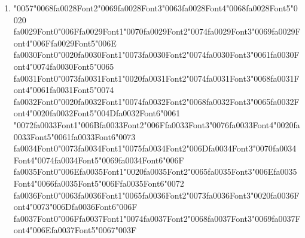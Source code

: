 \documentclass[12pt]{article}
\begin{document}
\begin{enumerate}[label=Q\arabic*.]
 \begin{enumerate}[label=(\Alph*)]
     \item The hidden state has fixed dimensionality
     \item They reuse identical parameters at every time step
     \item Gradients decay or explode during backpropagation
     \item They produce outputs only at the final step
 \end{enumerate}
 
 \item {\char"0057}{\char"0068}{\csname fa0028Font2\endcsname\char"0069}{\csname fa0028Font3\endcsname\char"0063}{\csname fa0028Font4\endcsname\char"0068}{\csname fa0028Font5\endcsname\char"0020} {\csname fa0029Font0\endcsname\char"006F}{\csname fa0029Font1\endcsname\char"0070}{\csname fa0029Font2\endcsname\char"0074}{\csname fa0029Font3\endcsname\char"0069}{\csname fa0029Font4\endcsname\char"006F}{\csname fa0029Font5\endcsname\char"006E} {\csname fa0030Font0\endcsname\char"0020}{\csname fa0030Font1\endcsname\char"0073}{\csname fa0030Font2\endcsname\char"0074}{\csname fa0030Font3\endcsname\char"0061}{\csname fa0030Font4\endcsname\char"0074}{\csname fa0030Font5\endcsname\char"0065} {\csname fa0031Font0\endcsname\char"0073}{\csname fa0031Font1\endcsname\char"0020}{\csname fa0031Font2\endcsname\char"0074}{\csname fa0031Font3\endcsname\char"0068}{\csname fa0031Font4\endcsname\char"0061}{\csname fa0031Font5\endcsname\char"0074} {\csname fa0032Font0\endcsname\char"0020}{\csname fa0032Font1\endcsname\char"0074}{\csname fa0032Font2\endcsname\char"0068}{\csname fa0032Font3\endcsname\char"0065}{\csname fa0032Font4\endcsname\char"0020}{\csname fa0032Font5\endcsname\char"004D}{\csname fa0032Font6\endcsname\char"0061} {\char"0072}{\csname fa0033Font1\endcsname\char"006B}{\csname fa0033Font2\endcsname\char"006F}{\csname fa0033Font3\endcsname\char"0076}{\csname fa0033Font4\endcsname\char"0020}{\csname fa0033Font5\endcsname\char"0061}{\csname fa0033Font6\endcsname\char"0073} {\csname fa0034Font0\endcsname\char"0073}{\csname fa0034Font1\endcsname\char"0075}{\csname fa0034Font2\endcsname\char"006D}{\csname fa0034Font3\endcsname\char"0070}{\csname fa0034Font4\endcsname\char"0074}{\csname fa0034Font5\endcsname\char"0069}{\csname fa0034Font6\endcsname\char"006F} {\csname fa0035Font0\endcsname\char"006E}{\csname fa0035Font1\endcsname\char"0020}{\csname fa0035Font2\endcsname\char"0065}{\csname fa0035Font3\endcsname\char"006E}{\csname fa0035Font4\endcsname\char"0066}{\csname fa0035Font5\endcsname\char"006F}{\csname fa0035Font6\endcsname\char"0072} {\csname fa0036Font0\endcsname\char"0063}{\csname fa0036Font1\endcsname\char"0065}{\csname fa0036Font2\endcsname\char"0073}{\csname fa0036Font3\endcsname\char"0020}{\csname fa0036Font4\endcsname\char"0073}{\char"006D}{\csname fa0036Font6\endcsname\char"006F} {\csname fa0037Font0\endcsname\char"006F}{\csname fa0037Font1\endcsname\char"0074}{\csname fa0037Font2\endcsname\char"0068}{\csname fa0037Font3\endcsname\char"0069}{\csname fa0037Font4\endcsname\char"006E}{\csname fa0037Font5\endcsname\char"0067}{\char"003F}

\end{enumerate}
\end{document}
